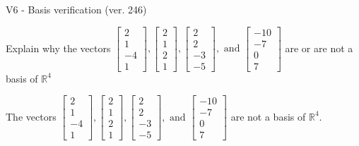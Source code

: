 \begin{exercise}
  \begin{exerciseTitle}V6 - Basis verification (ver. 246)\end{exerciseTitle}
  \begin{exerciseStatement}
    Explain why the vectors \(\left[\begin{array}{r}
2 \\
1 \\
-4 \\
1
\end{array}\right] , \left[\begin{array}{r}
2 \\
1 \\
2 \\
1
\end{array}\right] , \left[\begin{array}{r}
2 \\
2 \\
-3 \\
-5
\end{array}\right] , \text{ and } \left[\begin{array}{r}
-10 \\
-7 \\
0 \\
7
\end{array}\right]\) are or are not a basis of \(\mathbb{R}^4\)	


  \end{exerciseStatement}
  \begin{exerciseAnswer}
   The vectors \(\left[\begin{array}{r}
2 \\
1 \\
-4 \\
1
\end{array}\right] , \left[\begin{array}{r}
2 \\
1 \\
2 \\
1
\end{array}\right] , \left[\begin{array}{r}
2 \\
2 \\
-3 \\
-5
\end{array}\right] , \text{ and } \left[\begin{array}{r}
-10 \\
-7 \\
0 \\
7
\end{array}\right]\) 
  	 are not  a basis of \(\mathbb{R}^4\).
  


  \end{exerciseAnswer}
\end{exercise}